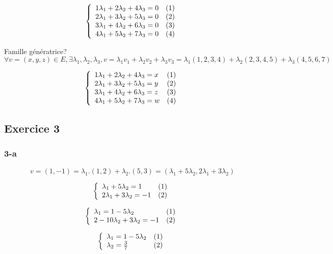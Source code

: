 \documentclass[]{book}
\theoremstyle{definition}
\begin{document}
$$
\left\{ 
\begin{array}{l l}
1 \lambda_1 + 2 \lambda_2 + 4 \lambda_3 = 0 & (1)\\
2 \lambda_1 + 3 \lambda_2 + 5 \lambda_3 = 0 & (2)\\
3 \lambda_1 + 4 \lambda_2 + 6 \lambda_3 = 0 & (3)\\
4 \lambda_1 + 5 \lambda_2 + 7 \lambda_3 = 0 & (4)\\
\end{array}
\right. 
$$ 


Famille g\'en\'eratrice?
$$\forall v = (x,y,z) \in E, \exists \lambda_1, \lambda_2, \lambda_3, v = \lambda_1 v_1 + \lambda_2 v_2 + \lambda_3 v_3 = \lambda_1 (1,2,3,4) + \lambda_2 (2,3,4,5) + \lambda_3 (4,5,6,7)$$

$$
\left\{ 
\begin{array}{l l}
1 \lambda_1 + 2 \lambda_2 + 4 \lambda_3 = x & (1)\\
2 \lambda_1 + 3 \lambda_2 + 5 \lambda_3 = y & (2)\\
3 \lambda_1 + 4 \lambda_2 + 6 \lambda_3 = z & (3)\\
4 \lambda_1 + 5 \lambda_2 + 7 \lambda_3 = w & (4)\\
\end{array}
\right. 
$$ 


\subsection*{Exercice 3}
\subsubsection*{3-a}
$$v = (1,-1)= \lambda_1.(1,2) + \lambda_2.(5,3) = (\lambda_1+5\lambda_2,2\lambda_1+3\lambda_2)$$

$$
\left\{ 
\begin{array}{l l}
\lambda_1+5\lambda_2 = 1 & (1)\\
2\lambda_1+3\lambda_2 = -1 & (2)\\
\end{array}
\right. 
$$ 

$$
\left\{ 
\begin{array}{l l}
\lambda_1 = 1 - 5\lambda_2 & (1)\\
2-10\lambda_2+3\lambda_2 = -1 & (2)\\
\end{array}
\right. 
$$ 

$$
\left\{ 
\begin{array}{l l}
\lambda_1 = 1 - 5\lambda_2 & (1)\\
\lambda_2 = \frac{3}{7} & (2)\\
\end{array}
\right. 
$$ 
\end{document}
